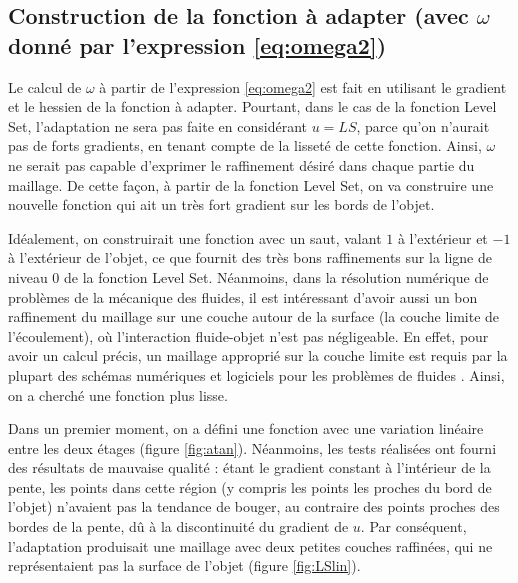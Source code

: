 \subsection{Construction de la fonction à adapter (avec \(\omega\) donné par l'expression \eqref{eq:omega2})}

\indent Le calcul de \(\omega\) à partir de l'expression \eqref{eq:omega2} est fait en utilisant le gradient et le hessien de la fonction à adapter. Pourtant, dans le cas de la fonction Level Set, l'adaptation ne sera pas faite en considérant \(u=LS\), parce qu'on n'aurait pas de forts gradients, en tenant compte de la lisseté de cette fonction. Ainsi, \(\omega\) ne serait pas capable d'exprimer le raffinement désiré dans chaque partie du maillage. De cette façon, à partir de la fonction Level Set, on va construire une nouvelle fonction qui ait un très fort gradient sur les bords de l'objet.

\indent Idéalement, on construirait une fonction avec un saut, valant \(1\) à l'extérieur et \(-1\) à l'extérieur de l'objet, ce que fournit des très bons raffinements sur la ligne de niveau 0 de la fonction Level Set. Néanmoins, dans la résolution numérique de problèmes de la mécanique des fluides, il est intéressant d'avoir aussi un bon raffinement du maillage sur une couche autour de la surface (la couche limite de l'écoulement), où l'interaction fluide-objet n'est pas négligeable. En effet, pour avoir un calcul précis, un maillage approprié sur la couche limite est requis par la plupart des schémas numériques et logiciels pour les problèmes de fluides \cite{loseille}. Ainsi, on a cherché une fonction plus lisse.

\indent Dans un premier moment, on a défini une fonction avec une variation linéaire entre les deux étages (figure \ref{fig:atan}). Néanmoins, les tests réalisées ont fourni des résultats de mauvaise qualité : étant le gradient constant à l'intérieur de la pente, les points dans cette région (y compris les points les proches du bord de l'objet) n'avaient pas la tendance de bouger, au contraire des points proches des bordes de la pente, dû à la discontinuité du gradient de \(u\). Par conséquent, l'adaptation produisait une maillage avec deux petites couches raffinées, qui ne représentaient pas la surface de l'objet (figure \ref{fig:LSlin}).

